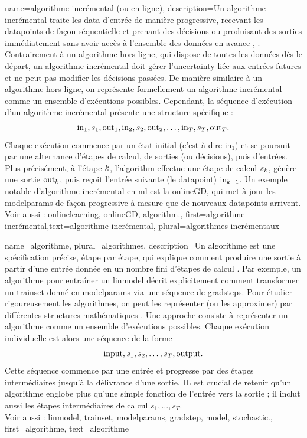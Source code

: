 {name={algorithme incrémental (ou en ligne)},
	description={Un algorithme incrémental traite les \gls{data} d’entrée de manière progressive, recevant les \glspl{datapoint} de façon séquentielle et prenant des décisions ou produisant des sorties immédiatement sans avoir accès à l’ensemble des données en avance \cite{PredictionLearningGames}, \cite{HazanOCO}. Contrairement à un algorithme hors ligne, qui dispose de toutes les données dès le départ, un algorithme incrémental doit gérer l’\gls{uncertainty} liée aux entrées futures et ne peut pas modifier les décisions passées.  
		De manière similaire à un algorithme hors ligne, on représente formellement un algorithme incrémental comme un ensemble d’exécutions possibles. Cependant, la séquence d’exécution d’un algorithme incrémental présente une structure spécifique :  
		$${\rm in}_{1}, s_1, {\rm out}_{1}, {\rm in}_{2}, s_2, {\rm out}_{2}, \ldots, {\rm in}_{T}, s_T, {\rm out}_{T}.$$  
		Chaque exécution commence par un état initial (c’est-à-dire \(\text{in}_{1}\)) et se poursuit par une alternance d’étapes de calcul, de sorties (ou décisions), puis d’entrées. Plus précisément, à l’étape \(k\), l’\gls{algorithm} effectue une étape de calcul \(s_{k}\), génère une sortie \(\text{out}_{k}\), puis reçoit l’entrée suivante (le \gls{datapoint}) \(\text{in}_{k+1}\).  
		Un exemple notable d’algorithme incrémental en \gls{ml} est la \gls{onlineGD}, qui met à jour les \gls{modelparams} de façon progressive à mesure que de nouveaux \glspl{datapoint} arrivent.  
		\\ Voir aussi : \gls{onlinelearning}, \gls{onlineGD}, \gls{algorithm}.},
	first={algorithme incrémental},text={algorithme incrémental}, plural={algorithmes incrémentaux}}

{name={algorithme}, plural={algorithmes},
	description={Un algorithme est une spécification précise, étape par étape, qui explique comment produire une sortie à partir d’une entrée donnée en un nombre fini d’étapes de calcul \cite{Cormen:2022aa}.  
		Par exemple, un algorithme pour entraîner un \gls{linmodel} décrit explicitement comment transformer un \gls{trainset} donné en \gls{modelparams} via une séquence de \glspl{gradstep}.  
		Pour étudier rigoureusement les algorithmes, on peut les représenter (ou les approximer) par différentes structures mathématiques \cite{Sipser2013}.  
		Une approche consiste à représenter un algorithme comme un ensemble d’exécutions possibles. Chaque exécution individuelle est alors une séquence de la forme $${\rm input}, s_1, s_2, \ldots, s_T, {\rm output}.$$  
		Cette séquence commence par une entrée et progresse par des étapes intermédiaires jusqu’à la délivrance d’une sortie.  
		IL est crucial de retenir qu'un algorithme englobe plus qu’une simple fonction de l’entrée vers la sortie ; il inclut aussi les étapes intermédiaires de calcul $s_1, \ldots, s_T$.
		\\
		Voir aussi : \gls{linmodel}, \gls{trainset}, \gls{modelparams}, \gls{gradstep}, \gls{model}, \gls{stochastic}.},
	first={algorithme},
	text={algorithme}
}

